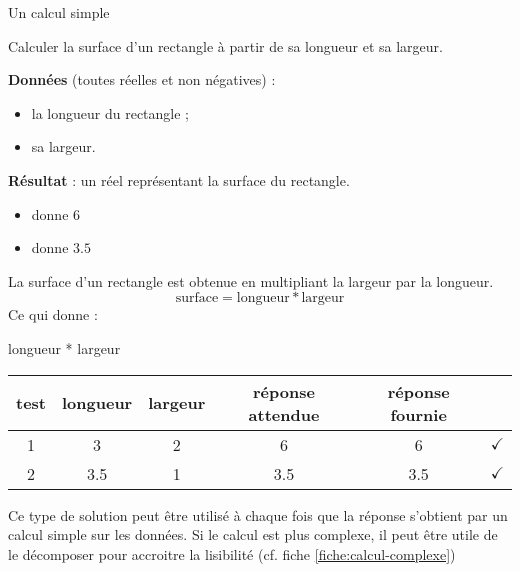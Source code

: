 \begin{Fiche}{Un calcul simple}
\label{fiche:calcul-simple}

Calculer la surface d'un rectangle à partir de sa longueur et sa largeur.
	

	\textbf{Données} (toutes réelles et non négatives) :
		\begin{itemize}
			\item la longueur du rectangle ;
			\item sa largeur.
		\end{itemize}
		
	\textbf{Résultat} : un réel représentant la surface du rectangle.

	\begin{center}	
	\end{center}


	\begin{itemize}
	\item {} donne $6$
	\item {} donne $3.5$
	\end{itemize}


	La surface d'un rectangle est obtenue en multipliant
	la largeur par la longueur.
	\[
		\textrm{surface} = \textrm{longueur} * \textrm{largeur}
	\]
	Ce qui donne :

	\begin{LDA}
			\Return longueur * largeur
		\EndAlgo
	\end{LDA}


	\begin{center}
		\begin{tabular}{|c|cccc|c|}
		\hline
		test \no & longueur & largeur & réponse attendue & réponse fournie & {} \\\hline
		\hline 
		1 & 3   & 2 & 6   & 6   & {\color{ForestGreen}$\checkmark$} \\\hline
		2 & 3.5 & 1 & 3.5 & 3.5 & {\color{ForestGreen}$\checkmark$} \\\hline
		\end{tabular}
	\end{center}				


	Ce type de solution peut être utilisé à chaque fois
	que la réponse s'obtient par un calcul simple sur les données.
	Si le calcul est plus complexe, 
	il peut être utile de le décomposer pour accroitre la lisibilité
	(cf. fiche \vref{fiche:calcul-complexe}) 
	
\end{Fiche}
